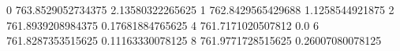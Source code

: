 0 763.8529052734375 2.13580322265625
1 762.8429565429688 1.1258544921875
2 761.8939208984375 0.17681884765625
4 761.7171020507812 0.0
6 761.8287353515625 0.11163330078125
8 761.9771728515625 0.26007080078125
